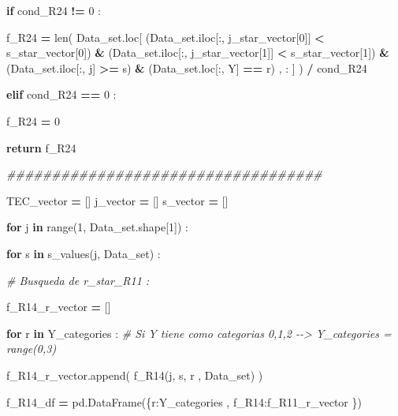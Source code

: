 \documentclass[
  11pt,
  a4paper,
]{article}
\newenvironment{Shaded}{\begin{snugshade}}{\end{snugshade}}
\newcommand{\BuiltInTok}[1]{#1}
\newcommand{\CommentTok}[1]{\textcolor[rgb]{0.56,0.35,0.01}{\textit{#1}}}
\newcommand{\ControlFlowTok}[1]{\textcolor[rgb]{0.13,0.29,0.53}{\textbf{#1}}}
\newcommand{\DecValTok}[1]{\textcolor[rgb]{0.00,0.00,0.81}{#1}}
\newcommand{\KeywordTok}[1]{\textcolor[rgb]{0.13,0.29,0.53}{\textbf{#1}}}
\newcommand{\NormalTok}[1]{#1}
\newcommand{\OperatorTok}[1]{\textcolor[rgb]{0.81,0.36,0.00}{\textbf{#1}}}
\newcommand{\StringTok}[1]{\textcolor[rgb]{0.31,0.60,0.02}{#1}}
\begin{document}
\begin{Shaded}
\begin{Highlighting}[]
            \ControlFlowTok{if}\NormalTok{  cond\_R24 }\OperatorTok{!=} \DecValTok{0}\NormalTok{ :}

\NormalTok{                f\_R24 }\OperatorTok{=} \BuiltInTok{len}\NormalTok{( Data\_set.loc[ (Data\_set.iloc[:, j\_star\_vector[}\DecValTok{0}\NormalTok{]] }\OperatorTok{\textless{}}\NormalTok{ s\_star\_vector[}\DecValTok{0}\NormalTok{]) }\OperatorTok{\&}\NormalTok{ (Data\_set.iloc[:, j\_star\_vector[}\DecValTok{1}\NormalTok{]] }\OperatorTok{\textless{}}\NormalTok{ s\_star\_vector[}\DecValTok{1}\NormalTok{]) }\OperatorTok{\&}\NormalTok{ (Data\_set.iloc[:, j] }\OperatorTok{\textgreater{}=}\NormalTok{ s) }\OperatorTok{\&}\NormalTok{ (Data\_set.loc[:, }\StringTok{\textquotesingle{}Y\textquotesingle{}}\NormalTok{] }\OperatorTok{==}\NormalTok{ r) , : ] ) }\OperatorTok{/}\NormalTok{ cond\_R24}

            
            \ControlFlowTok{elif}\NormalTok{ cond\_R24 }\OperatorTok{==} \DecValTok{0}\NormalTok{ :}

\NormalTok{                f\_R24 }\OperatorTok{=} \DecValTok{0}

            
            \ControlFlowTok{return}\NormalTok{ f\_R24 }


 \CommentTok{\#\#\#\#\#\#\#\#\#\#\#\#\#\#\#\#\#\#\#\#\#\#\#\#\#\#\#\#\#\#\#\#\#\#\#}

\NormalTok{        TEC\_vector }\OperatorTok{=}\NormalTok{ []}
\NormalTok{        j\_vector }\OperatorTok{=}\NormalTok{ []}
\NormalTok{        s\_vector }\OperatorTok{=}\NormalTok{ []}


        \ControlFlowTok{for}\NormalTok{ j }\KeywordTok{in} \BuiltInTok{range}\NormalTok{(}\DecValTok{1}\NormalTok{, Data\_set.shape[}\DecValTok{1}\NormalTok{]) :}

            \ControlFlowTok{for}\NormalTok{ s }\KeywordTok{in}\NormalTok{ s\_values(j, Data\_set) :}

                \CommentTok{\# Busqueda de r\_star\_R11 :}

\NormalTok{                f\_R14\_r\_vector }\OperatorTok{=}\NormalTok{ []}

                \ControlFlowTok{for}\NormalTok{ r }\KeywordTok{in}\NormalTok{ Y\_categories :  }\CommentTok{\# Si Y tiene como categorias 0,1,2 {-}{-}\textgreater{} Y\_categories = range(0,3)}

\NormalTok{                    f\_R14\_r\_vector.append( f\_R14(j, s, r , Data\_set) )}

\NormalTok{                f\_R14\_df }\OperatorTok{=}\NormalTok{ pd.DataFrame(\{}\StringTok{\textquotesingle{}r\textquotesingle{}}\NormalTok{:Y\_categories  , }\StringTok{\textquotesingle{}f\_R14\textquotesingle{}}\NormalTok{:f\_R11\_r\_vector \})}
        

\end{Highlighting}
\end{Shaded}
\end{document}
